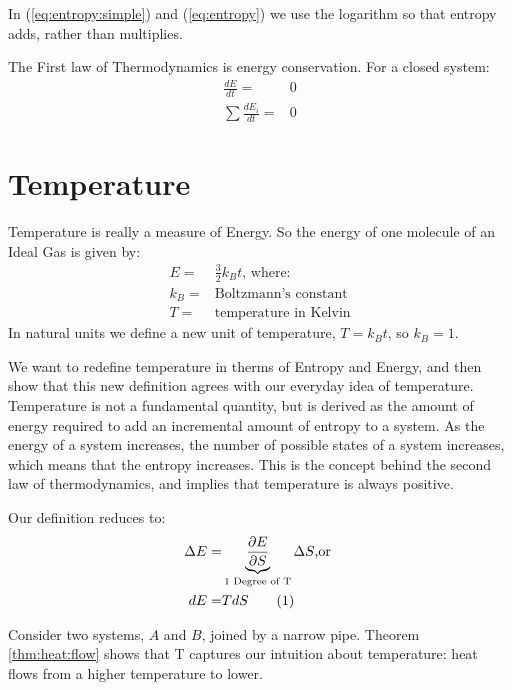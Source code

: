 \documentclass[]{article}
\newcommand\numberthis{\addtocounter{equation}{1}\tag{\theequation}}
\begin{document}
In (\ref{eq:entropy:simple}) and (\ref{eq:entropy}) we use the logarithm so that entropy adds, rather than multiplies.

The First law of Thermodynamics is energy conservation. For a closed system:
\begin{align*}
\frac{dE}{dt} =& 0\\
\sum \frac{dE_i}{dt} =& 0
\end{align*}


\section{Temperature}

Temperature is really a measure of Energy. So the energy of one molecule of an Ideal Gas is given by:
\begin{align*}
E =& \frac{3}{2} k_B t\text{, where:}\\
k_B =& \text{Boltzmann's constant}\\
T =& \text{temperature in Kelvin}
\end{align*}
 In natural units we define a new unit of temperature, $T=k_Bt$, so $k_B=1$.
 
 We want to redefine temperature in therms of Entropy and Energy, and then show that this new definition agrees with our everyday idea of temperature. Temperature is not a fundamental quantity, but is derived as the amount of energy required to add an incremental amount of entropy to a system.  As the energy of a system increases, the number of possible states of a system increases, which means that the entropy increases.  This is the concept behind the second law of thermodynamics, and implies that temperature is always positive.
 
 Our definition reduces to:
\begin{align*}
\Delta E =& \underbrace{\frac{\partial E}{\partial S}}_\text{1 Degree of T} \Delta S\text{,or }\\
dE =& T dS \numberthis \label{eq:T}
\end{align*}

Consider two systems, $A$ and $B$, joined by a narrow pipe. Theorem \ref{thm:heat:flow} shows that T captures our intuition about temperature: heat flows from a higher temperature to lower.
\end{document}
